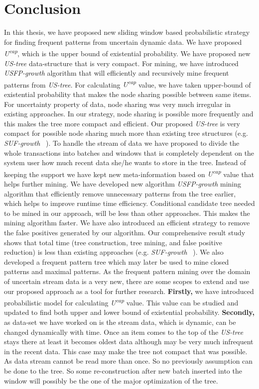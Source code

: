 \documentclass[conference]{IEEEtran}
\begin{document}
\section{Conclusion}
In this thesis, we have proposed new sliding window based probabilistic strategy for finding frequent patterns from uncertain dynamic data. We have proposed \emph{U\textsuperscript{cap}}, which is the upper bound of existential probability. We have proposed new \emph{US-tree} data-structure that is very compact. For mining, we have introduced \emph{USFP-growth} algorithm that will efficiently and recursively mine frequent patterns from \emph{US-tree}.
For calculating \emph{U\textsuperscript{cap}} value, we have taken upper-bound of existential probability that makes the node sharing possible between same items. For uncertainty property of data, node sharing was very much irregular in existing approaches. In our strategy, node sharing is possible more frequently and this makes the tree more compact and efficient. Our proposed \emph{US-tree} is very compact for possible node sharing much more than existing tree structures (e.g. \emph{SUF-growth} ~\cite{suf_growth}). To handle the stream of data we have proposed to divide the whole transactions into batches and windows that is completely dependent on the system user how much recent data she/he wants to store in the tree. Instead of keeping the support we have kept new meta-information based on \emph{U\textsuperscript{cap}} value that helps further mining. We have developed new algorithm \emph{USFP-growth} mining algorithm that efficiently remove unnecessary patterns from the tree earlier, which helps to improve runtime time efficiency. Conditional candidate tree needed to be mined in our approach, will be less than other approaches. This makes the mining algorithm faster. We have also introduced an efficient strategy to remove the false positives generated by our algorithm. Our comprehensive result study shows that total time (tree construction, tree mining, and false positive reduction) is less than existing approaches (e.g. \emph{SUF-growth} ~\cite{suf_growth}). We also developed a frequent pattern tree which may later be used to mine closed patterns and maximal patterns.
As the frequent pattern mining over the domain of uncertain stream data is a very new, there are some scopes to extend and use our proposed approach as a tool for further research.
\textbf{Firstly,} we have introduced probabilistic model for calculating \emph{U\textsuperscript{cap}} value. This value can be studied and updated to find both upper and lower bound of existential probability.
\textbf{Secondly,} as data-set we have worked on is the stream data, which is dynamic, can be changed dynamically with time. Once an item comes to the top of the \emph{US-tree} stays there at least it becomes oldest data although may be very much infrequent in the recent data. This case may make the tree not compact that was possible. As data stream cannot be read more than once. So no previously assumption can be done to the tree. So some re-construction after new batch inserted into the window will possibly be the one of the major optimization of the tree.
\end{document}
